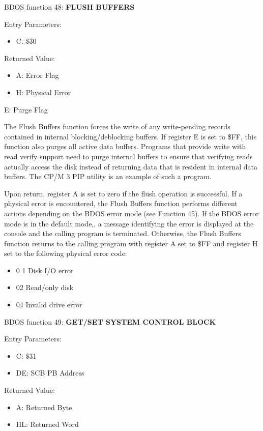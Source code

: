 BDOS function 48: \textbf{FLUSH BUFFERS}

Entry Parameters:
\begin{itemize}
\item[] C: \$30
\end{itemize}

Returned Value:
\begin{itemize}
\item[] A: Error Flag
\item[] H: Physical Error
\end{itemize} E: Purge Flag

The Flush Buffers function forces the write of any write-pending
records contained in internal blocking/deblocking buffers. If register
E is set to \$FF, this function also purges all active data
buffers. Programs that provide write with read verify support need to
purge internal buffers to ensure that verifying reads actually access
the disk instead of returning data that is resident in internal data
buffers. The CP/M 3 PIP utility is an example of such a program.

Upon return, register A is set to zero if the flush operation is
successful. If a physical error is encountered, the Flush Buffers
function performs different actions depending on the BDOS error mode
(see Function 45). If the BDOS error mode is in the default mode,, a
message identifying the error is displayed at the console and the
calling program is terminated. Otherwise, the Flush Buffers function
returns to the calling program with register A set to \$FF and
register H set to the following physical error code:

\begin{itemize}
\item 0 1 Disk I/O error
\item 02 Read/only disk
\item 04 Invalid drive error
\end{itemize}

BDOS function 49: \textbf{GET/SET SYSTEM CONTROL BLOCK}

Entry Parameters:
\begin{itemize}
\item[] C: \$31
\item[] DE: SCB PB Address
\end{itemize}

Returned Value:
\begin{itemize}
\item[] A: Returned Byte
\item[] HL: Returned Word
\end{itemize}

